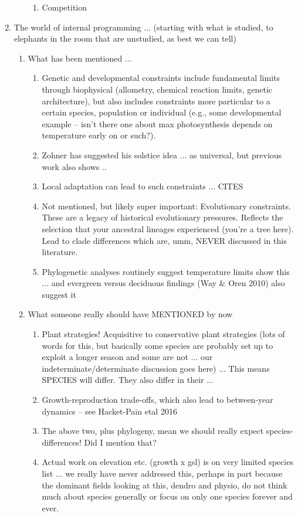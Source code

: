 \documentclass[11pt,letter]{article}
\begin{document}
\begin{enumerate}
\begin{enumerate}
\begin{enumerate}
\item Competition
\end{enumerate}
\end{enumerate}
\item The world of internal programming ... (starting with what is studied, to elephants in the room that are unstudied, as best we can tell)
\begin {enumerate}
\item What has been mentioned ... 
\begin {enumerate}
\item Genetic and developmental constraints include fundamental limits through biophysical (allometry, chemical reaction limits, genetic architecture), but also includes constraints more particular to a certain species, population or individual (e.g., some developmental example -- isn't there one about max photosynthesis depends on temperature early on or such?).  
\item Zohner has suggested his solstice idea ... as universal, but previous work also shows ..
\item Local adaptation can lead to such constraints ... CITES
\item Not mentioned, but likely super important: Evolutionary constraints. These are a legacy of historical evolutionary pressures. Reflects the selection that your ancestral lineages experienced (you're a tree here). Lead to clade differences which are, umm, NEVER discussed in this literature. 
\item Phylogenetic analyses routinely suggest temperature limits show this ... and evergreen versus deciduous findings (Way \& Oren 2010) also suggest it
\end{enumerate}
\item What someone really should have MENTIONED by now 
\begin {enumerate}
\item Plant strategies! Acquisitive to conservative plant strategies (lots of words for this, but basically some species are probably set up to exploit a longer season and some are not ... our indeterminate/determinate discussion goes here) ... This means SPECIES will differ. They also differ in their ... 
\item Growth-reproduction trade-offs, which also lead to between-year dynamics  -- see Hacket-Pain etal 2016
\item The above two, plus phylogeny, mean we should really expect species-differences! Did I mention that? 
\item Actual work on elevation etc. (growth x gsl) is on very limited species list ... we really have never addressed this, perhaps in part because the dominant fields looking at this, dendro and physio, do not think much about species generally or focus on only one species forever and ever. 

\end{enumerate}
\end{enumerate}
\end{enumerate}
\end{document}
